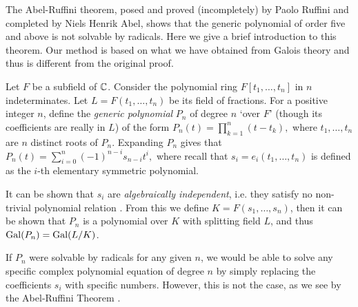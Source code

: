 The Abel-Ruffini theorem, posed and proved (incompletely) by Paolo Ruffini and completed by Niels Henrik Abel, shows that the generic polynomial of order five and above is not solvable by radicals. Here we give a brief introduction to this theorem. Our method is based on what we have obtained from Galois theory and thus is different from the original proof. 

\begin{definition}
	Let $F$ be a subfield of $\mathbb C$. Consider the polynomial ring $F[t_1, \dots, t_n]$ in $n$ indeterminates. Let $L = F(t_1, \dots, t_n)$ be its field of fractions. For a positive integer $n$, define the \textit{generic polynomial} $P_n$ of degree $n$ `over $F$' (though its coefficients are really in $L$) of the form
	$
	P_n(t) = \prod_{k=1}^{n} (t - t_k),
	$
	where $t_1, \dots, t_n $ are $n$ distinct roots of $P_n$. Expanding $P_n$ gives that 
	$
	P_n(t) = \sum_{i=0}^{n} (-1)^{n - i} s_{n-i} t^i,
	$
	where recall that $s_{i} = e_i(t_1,\dots,t_n)$ is defined as the $i$-th elementary symmetric polynomial.
\end{definition}

It can be shown that $s_{i}$ are \textit{algebraically independent}, i.e. they satisfy no non-trivial polynomial relation \cite[p.~112]{Stewart}. From this we define $K = F(s_1, \dots, s_n)$, then it can be shown that $P_n$ is a polynomial over $K$ with splitting field $L$, and thus $\operatorname{Gal}(P_n) = \operatorname{Gal}(L/K)$. 

If $P_n$ were solvable by radicals for any given $n$, we would be able to solve any specific complex polynomial equation of degree $n$ by simply replacing the coefficients $s_i$ with specific numbers. However, this is not the case, as we see by the Abel-Ruffini Theorem \cite{galois-lecture-polynomials, commutative-algebra-uon, Abel-Ruffini}.




%
%


